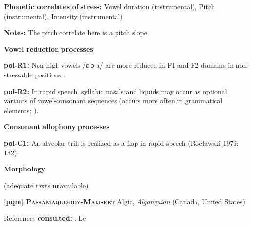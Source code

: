 \documentclass[output=paper]{langsci/langscibook}
\begin{document}
\begin{styleBody}
\textbf{Phonetic} \textbf{correlates} \textbf{of} \textbf{stress:} Vowel duration (instrumental), Pitch (instrumental), Intensity (instrumental)
\end{styleBody}

\begin{styleBody}
\textbf{Notes:} The pitch correlate here is a pitch slope.
\end{styleBody}

\begin{styleBody}
\textbf{Vowel} \textbf{reduction} \textbf{processes}
\end{styleBody}

\begin{styleBody}
\textbf{pol-R1:} Non-high vowels /ɛ ɔ a/ are more reduced in F1 and F2 domains in non-stressable positions \citep[378-9]{Nowak2006}.
\end{styleBody}

\begin{styleBody}
\textbf{pol-R2:} In rapid speech, syllabic nasals and liquids may occur as optional variants of vowel-consonant sequences (occurs more often in grammatical elements; \citealt{Rubach1974}).
\end{styleBody}

\begin{styleBody}
\textbf{Consonant} \textbf{allophony} \textbf{processes}
\end{styleBody}

\begin{styleBody}
\textbf{pol-C1:} An alveolar trill is realized as a flap in rapid speech (Rocławski 1976: 132).
\end{styleBody}

\begin{styleBody}
\textbf{Morphology}
\end{styleBody}

\begin{styleBody}
(adequate texts unavailable)
\end{styleBody}

\begin{styleBody}
\textbf{[pqm]}   \textbf{\textsc{Passamaquoddy-Maliseet}}  Algic, \textit{Algonquian} (Canada, United States)
\end{styleBody}

\begin{styleBody}
References \textbf{consulted:} \citet{Leavitt1996}, Le\citet{Sourd1993}
\end{styleBody}
\end{document}
